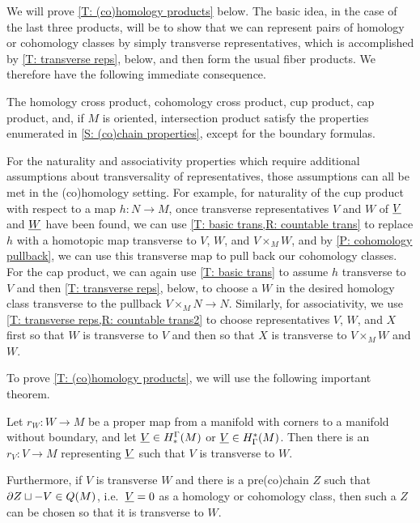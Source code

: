 We will prove \cref{T: (co)homology products} below.
The basic idea, in the case of the last three products, will be to show that we can represent pairs of homology or cohomology classes by simply transverse representatives, which is accomplished by \cref{T: transverse reps}, below, and then form the usual fiber products.
We therefore have the following immediate consequence.

\begin{theorem}
	The homology cross product, cohomology cross product, cup product, cap product, and, if $M$ is oriented, intersection product satisfy the properties enumerated in \cref{S: (co)chain properties}, except for the boundary formulas.
\end{theorem}

\begin{remark}
	For the naturality and associativity properties which require additional assumptions about transversality of representatives, those assumptions can all be met in the (co)homology setting.
	For example, for naturality of the cup product with respect to a map $h \colon N \to M$, once transverse representatives $V$ and $W$ of $\underline{V}$ and $\underline{W}$ have been found, we can use \cref{T: basic trans,R: countable trans} to replace $h$ with a homotopic map transverse to $V$, $W$, and $V \times_M W$, and by \cref{P: cohomology pullback}, we can use this transverse map to pull back our cohomology classes.
	For the cap product, we can again use \cref{T: basic trans} to assume $h$ transverse to $V$ and then \cref{T: transverse reps}, below, to choose a $W$ in the desired homology class transverse to the pullback $V \times_M N \to N$.
	Similarly, for associativity, we use \cref{T: transverse reps,R: countable trans2} to choose representatives $V$, $W$, and $X$ first so that $W$ is transverse to $V$ and then so that $X$ is transverse to $V \times_M W$ and $W$.
\end{remark}

To prove \cref{T: (co)homology products}, we will use the following important theorem.

\begin{theorem}\label{T: transverse reps}
Let $r_W \colon W \to M$ be a proper map from a manifold with corners to a manifold without boundary, and let $\underline{V} \in H_*^\Gamma(M)$ or $\underline{V} \in H^*_\Gamma(M)$.
Then there is an $r_V \colon V \to M$ representing $\underline{V}$ such that $V$ is transverse to $W$.

Furthermore, if $V$ is transverse $W$ and there is a pre(co)chain $Z$ such that $\partial Z \sqcup -V \in Q(M)$, i.e.\ $\underline{V} = 0$ as a homology or cohomology class, then such a $Z$ can be chosen so that it is transverse to $W$.
\end{theorem}

